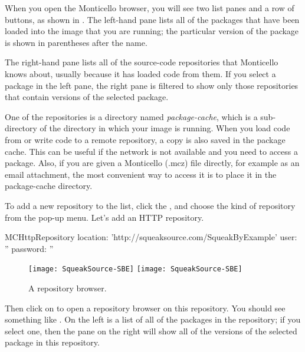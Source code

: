 \documentclass[a4paper,10pt,twoside]{book}
\begin{document}
When you open the Monticello browser, you will see two list panes and a row of buttons, as shown in .
The left-hand pane lists all of the packages that have been loaded into the image that you are running; the particular version of the package is shown in parentheses after the name.

The right-hand pane lists all of the source-code repositories that Monticello knows about, usually because it has loaded code from them.  If you select a package in the left pane, the right pane is filtered to show only those repositories that contain versions of the selected package.

One of the repositories is a directory named \emph{package-cache}, which is a sub-directory of the directory in which your image is running.
When you load code from or write code to a remote repository, a copy is also saved in the package cache.
This can be useful if the network is not available and you need to access a package.
Also, if you are given a Monticello (.mcz) file directly, for example as an email attachment, the most convenient way to access it is to place it in the package-cache directory.

To add a new repository to the list, click the , and choose the kind of repository from the pop-up menu.
Let's add an HTTP repository.

\begin{code}{}
MCHttpRepository
	location: 'http://squeaksource.com/SqueakByExample'
	user: ''
	password: ''
\end{code}

\begin{figure}[btp]
	\begin{center}
	\ifluluelse
		{\texttt{[image: SqueakSource-SBE]}}
		{\texttt{[image: SqueakSource-SBE]}}
	\end{center}
	\caption{A repository browser.}
	\label{fig:SqueakSource:SBE}
\end{figure}
\noindent
Then click on  to open a repository browser on this repository.
You should see something like .
On the left is a list of all of the packages in the repository; if you select one, then the pane on the right will show all of the versions of the selected package in this repository.
\end{document}
